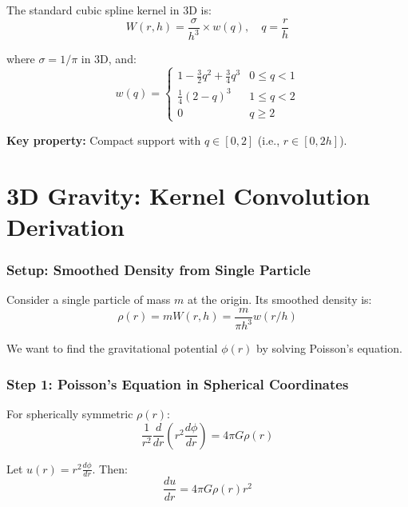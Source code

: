 \documentclass[12pt]{article}
\begin{document}
The standard cubic spline kernel in 3D is:
\begin{equation}
W(r, h) = \frac{\sigma}{h^3} \times w(q), \quad q = \frac{r}{h}
\end{equation}

where $\sigma = 1/\pi$ in 3D, and:
\begin{equation}
\boxed{w(q) = \begin{cases}
1 - \frac{3}{2}q^2 + \frac{3}{4}q^3 & 0 \leq q < 1 \\[4pt]
\frac{1}{4}(2-q)^3 & 1 \leq q < 2 \\[4pt]
0 & q \geq 2
\end{cases}}
\end{equation}

\textbf{Key property:} Compact support with $q \in [0, 2]$ (i.e., $r \in [0, 2h]$).

\part{3D Gravity: Kernel Convolution Derivation}

\section{Setup: Smoothed Density from Single Particle}

Consider a single particle of mass $m$ at the origin. Its smoothed density is:
\begin{equation}
\rho(r) = m W(r, h) = \frac{m}{\pi h^3} w(r/h)
\end{equation}

We want to find the gravitational potential $\phi(r)$ by solving Poisson's equation.

\section{Step 1: Poisson's Equation in Spherical Coordinates}

For spherically symmetric $\rho(r)$:
\begin{equation}
\frac{1}{r^2} \frac{d}{dr}\left(r^2 \frac{d\phi}{dr}\right) = 4\pi G \rho(r)
\end{equation}

Let $u(r) = r^2 \frac{d\phi}{dr}$. Then:
\begin{equation}
\frac{du}{dr} = 4\pi G \rho(r) r^2
\end{equation}
\end{document}
